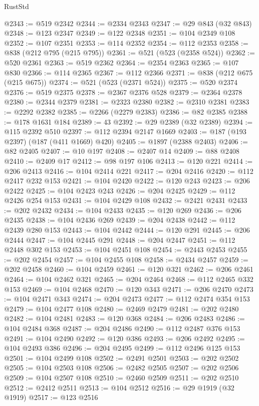 \begin{lexlean}{RustStd}
\begin{coremodule}
@2343 := @519 @2342
@2344 := @2334 @2343
@2347 := @29 @843 (@32 @843)
@2348 := @123 @2347
@2349 := @122 @2348
@2351 := @104 @2349 @108
@2352 := @107 @2351
@2353 := @114 @2352
@2354 := @112 @2353
@2358 := @838 (@212 @795 (@215 @795))
@2361 := @521 (@523 (@2358 @524))
@2362 := @520 @2361
@2363 := @519 @2362
@2364 := @2354 @2363
@2365 := @107 @830
@2366 := @114 @2365
@2367 := @112 @2366
@2371 := @838 (@212 @675 (@215 @675))
@2374 := @521 (@523 (@2371 @524))
@2375 := @520 @2374
@2376 := @519 @2375
@2378 := @2367 @2376 @528
@2379 := @2364 @2378
@2380 := @2344 @2379
@2381 := @2323 @2380
@2382 := @2310 @2381
@2383 := @2292 @2382
@2385 := @2266 (@2279 @2383)
@2386 := @82 @2385
@2388 := @178 @1631 @184
@2389 := 43
@2392 := @29 @2389 (@32 @2389)
@2394 := @115 @2392 @510
@2397 := @112 @2394 @2147 @1669
@2403 := @187 (@193 @2397) (@187 (@411 @1669) @420)
@2405 := @1897 (@2388 @2403)
@2406 := @82 @2405
@2407 := @10 @197
@2408 := @2407 @14
@2409 := @88 @2408
@2410 := @2409 @17
@2412 := @98 @197 @106
@2413 := @120 @221
@2414 := @206 @2413
@2416 := @104 @2414 @221
@2417 := @204 @2416
@2420 := @112 @2417 @232 @153
@2421 := @104 @2420
@2422 := @120 @243
@2423 := @206 @2422
@2425 := @104 @2423 @243
@2426 := @204 @2425
@2429 := @112 @2426 @254 @153
@2431 := @104 @2429 @108
@2432 := @2421 @2431
@2433 := @202 @2432
@2434 := @104 @2433
@2435 := @120 @269
@2436 := @206 @2435
@2438 := @104 @2436 @269
@2439 := @204 @2438
@2442 := @112 @2439 @280 @153
@2443 := @104 @2442
@2444 := @120 @291
@2445 := @206 @2444
@2447 := @104 @2445 @291
@2448 := @204 @2447
@2451 := @112 @2448 @302 @153
@2453 := @104 @2451 @108
@2454 := @2443 @2453
@2455 := @202 @2454
@2457 := @104 @2455 @108
@2458 := @2434 @2457
@2459 := @202 @2458
@2460 := @104 @2459
@2461 := @120 @321
@2462 := @206 @2461
@2464 := @104 @2462 @321
@2465 := @204 @2464
@2468 := @112 @2465 @332 @153
@2469 := @104 @2468
@2470 := @120 @343
@2471 := @206 @2470
@2473 := @104 @2471 @343
@2474 := @204 @2473
@2477 := @112 @2474 @354 @153
@2479 := @104 @2477 @108
@2480 := @2469 @2479
@2481 := @202 @2480
@2482 := @104 @2481
@2483 := @120 @368
@2484 := @206 @2483
@2486 := @104 @2484 @368
@2487 := @204 @2486
@2490 := @112 @2487 @376 @153
@2491 := @104 @2490
@2492 := @120 @386
@2493 := @206 @2492
@2495 := @104 @2493 @386
@2496 := @204 @2495
@2499 := @112 @2496 @125 @153
@2501 := @104 @2499 @108
@2502 := @2491 @2501
@2503 := @202 @2502
@2505 := @104 @2503 @108
@2506 := @2482 @2505
@2507 := @202 @2506
@2509 := @104 @2507 @108
@2510 := @2460 @2509
@2511 := @202 @2510
@2512 := @2412 @2511
@2513 := @104 @2512
@2516 := @29 @1919 (@32 @1919)
@2517 := @123 @2516

\end{coremodule}
\end{lexlean}
